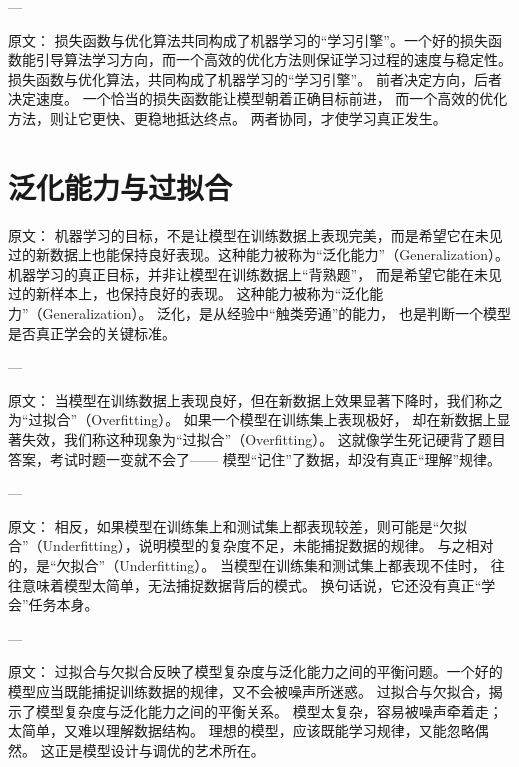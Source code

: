 ---

原文：
损失函数与优化算法共同构成了机器学习的“学习引擎”。一个好的损失函数能引导算法学习方向，而一个高效的优化方法则保证学习过程的速度与稳定性。
损失函数与优化算法，共同构成了机器学习的“学习引擎”。  
前者决定方向，后者决定速度。  
一个恰当的损失函数能让模型朝着正确目标前进，  
而一个高效的优化方法，则让它更快、更稳地抵达终点。  
两者协同，才使学习真正发生。

\section{泛化能力与过拟合}

原文：
机器学习的目标，不是让模型在训练数据上表现完美，而是希望它在未见过的新数据上也能保持良好表现。这种能力被称为“泛化能力”（Generalization）。
机器学习的真正目标，并非让模型在训练数据上“背熟题”，  
而是希望它能在未见过的新样本上，也保持良好的表现。  
这种能力被称为“泛化能力”（Generalization）。  
泛化，是从经验中“触类旁通”的能力，  
也是判断一个模型是否真正学会的关键标准。

---

原文：
当模型在训练数据上表现良好，但在新数据上效果显著下降时，我们称之为“过拟合”（Overfitting）。
如果一个模型在训练集上表现极好，  
却在新数据上显著失效，我们称这种现象为“过拟合”（Overfitting）。  
这就像学生死记硬背了题目答案，考试时题一变就不会了——  
模型“记住”了数据，却没有真正“理解”规律。

---

原文：
相反，如果模型在训练集上和测试集上都表现较差，则可能是“欠拟合”（Underfitting），说明模型的复杂度不足，未能捕捉数据的规律。
与之相对的，是“欠拟合”（Underfitting）。  
当模型在训练集和测试集上都表现不佳时，  
往往意味着模型太简单，无法捕捉数据背后的模式。  
换句话说，它还没有真正“学会”任务本身。

---

原文：
过拟合与欠拟合反映了模型复杂度与泛化能力之间的平衡问题。一个好的模型应当既能捕捉训练数据的规律，又不会被噪声所迷惑。
过拟合与欠拟合，揭示了模型复杂度与泛化能力之间的平衡关系。  
模型太复杂，容易被噪声牵着走；太简单，又难以理解数据结构。  
理想的模型，应该既能学习规律，又能忽略偶然。  
这正是模型设计与调优的艺术所在。

